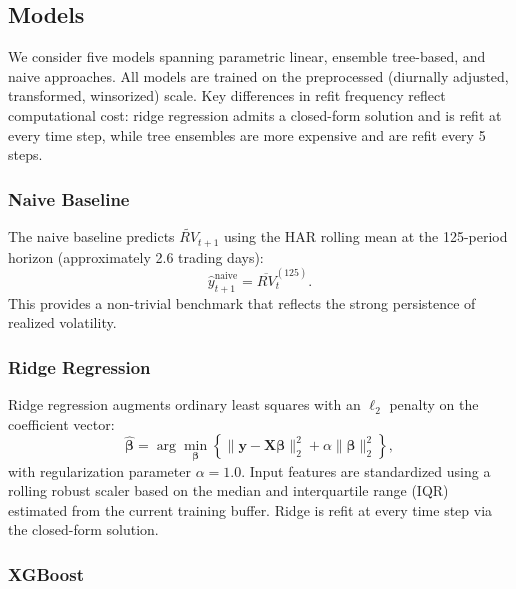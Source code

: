 \subsection{Models}
\label{sec:models}

We consider five models spanning parametric linear, ensemble tree-based, and naive approaches. All models are trained on the preprocessed (diurnally adjusted, transformed, winsorized) scale. Key differences in refit frequency reflect computational cost: ridge regression admits a closed-form solution and is refit at every time step, while tree ensembles are more expensive and are refit every 5 steps.

\subsubsection{Naive Baseline}
\label{sec:naive}

The naive baseline predicts $\widetilde{RV}_{t+1}$ using the HAR rolling mean at the 125-period horizon (approximately 2.6 trading days):
\begin{equation}
    \hat{y}_{t+1}^{\mathrm{naive}} = \overline{RV}_t^{(125)}.
    \label{eq:naive}
\end{equation}
This provides a non-trivial benchmark that reflects the strong persistence of realized volatility.

\subsubsection{Ridge Regression}
\label{sec:ridge}

Ridge regression augments ordinary least squares with an $\ell_2$ penalty on the coefficient vector:
\begin{equation}
    \hat{\boldsymbol{\beta}} = \arg\min_{\boldsymbol{\beta}} \left\{ \|\mathbf{y} - \mathbf{X}\boldsymbol{\beta}\|_2^2 + \alpha \|\boldsymbol{\beta}\|_2^2 \right\},
    \label{eq:ridge}
\end{equation}
with regularization parameter $\alpha = 1.0$. Input features are standardized using a rolling robust scaler based on the median and interquartile range (IQR) estimated from the current training buffer. Ridge is refit at every time step via the closed-form solution.

\subsubsection{XGBoost}
\label{sec:xgboost}

